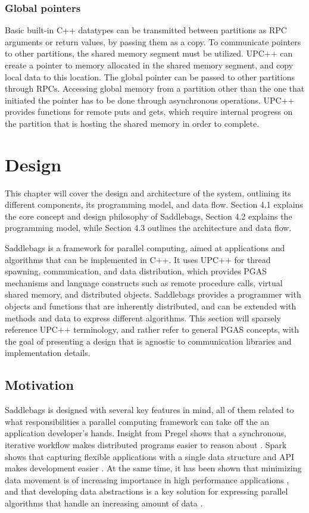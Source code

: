 \documentclass{uit-report}
\begin{document}
\subsection{Global pointers} \label{section:globalpointers}
Basic built-in C++ datatypes can be transmitted between partitions as RPC arguments or return values, by passing them as a copy. To communicate pointers to other partitions, the shared memory segment must be utilized. UPC++ can create a pointer to memory allocated in the shared memory segment, and copy local data to this location. The global pointer can be passed to other partitions through RPCs. Accessing global memory from a partition other than the one that initiated the pointer has to be done through asynchronous operations. UPC++ provides functions for remote puts and gets, which require internal progress on the partition that is hosting the shared memory in order to complete.


\newpage
\mbox{} \pagebreak
\chapter{Design} \label{chapter:design}
This chapter will cover the design and architecture of the system, outlining its different components, its programming model, and data flow. Section 4.1 explains the core concept and design philosophy of Saddlebags, Section 4.2 explains the programming model, while Section 4.3 outlines the architecture and data flow.

Saddlebags is a framework for parallel computing, aimed at applications and algorithms that can be implemented in C++. It uses UPC++ for thread spawning, communication, and data distribution, which provides PGAS mechanisms and language constructs such as remote procedure calls, virtual shared memory, and distributed objects. Saddlebags provides a programmer with objects and functions that are inherently distributed, and can be extended with methods and data to express different algorithms. This section will sparsely reference UPC++ terminology, and rather refer to general PGAS concepts, with the goal of presenting a design that is agnostic to communication libraries and implementation details.

\section{Motivation}
Saddlebags is designed with several key features in mind, all of them related to what responsibilities a parallel computing framework can take off the an application developer's hands. Insight from Pregel shows that a synchronous, iterative workflow makes distributed programs easier to reason about \cite{pregel}. Spark shows that capturing flexible applications with a single data structure and API makes development easier \cite{sparkarticle}. At the same time, it has been shown that minimizing data movement is of increasing importance in high performance applications \cite{abstractionslocality}, and that developing data  abstractions is a key solution for expressing parallel algorithms that handle an increasing amount of data \cite{hall2013rethinking}.
\end{document}
